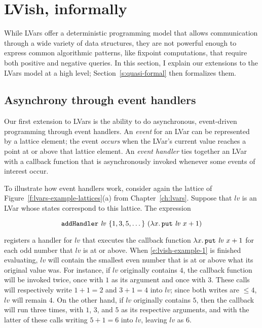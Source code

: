 \section{LVish, informally}\label{s:quasi-informal}

While LVars offer a deterministic programming model that allows
communication through a wide variety of data structures, they are not
powerful enough to express common algorithmic patterns, like fixpoint
computations, that require both positive and negative queries.  In
this section, I explain our extensions to the LVars model at a high
level; Section~\ref{s:quasi-formal} then formalizes them.

\subsection{Asynchrony through event handlers}

Our first extension to LVars is the ability to do asynchronous,
event-driven programming through event handlers.  An \emph{event} for
an LVar can be represented by a lattice element; the event
\emph{occurs} when the LVar's current value reaches a point at or
above that lattice element.  An \emph{event handler} ties together an
LVar with a callback function that is asynchronously invoked whenever
some events of interest occur.

To illustrate how event handlers work, consider again the lattice of
Figure~\ref{f:lvars-example-lattices}(a) from Chapter~\ref{ch:lvars}.
Suppose that $\mathit{lv}$ is an LVar whose states correspond to this
lattice.  The expression

\singlespacing
\begin{equation}
  {\mbox{\texttt{addHandler}}}~\mathit{lv}~\{ 1, 3, 5, \dots \}~(\lambda x.\,\mbox{\texttt{put}}~\mathit{lv}~x+1)
\label{e:lvish-example-1}
\end{equation}
\doublespacing

registers a handler for $\mathit{lv}$ that executes the callback
function $\lambda x.\,\mbox{\texttt{put}}~\mathit{lv}~x+1$ for each odd number that
$\mathit{lv}$ is at or above.  When \ref{e:lvish-example-1} is
finished evaluating, $\mathit{lv}$ will contain the smallest even
number that is at or above what its original value was.  For instance,
if $\mathit{lv}$ originally contains $4$, the callback function will
be invoked twice, once with $1$ as its argument and once with $3$.
These calls will respectively write $1+1 = 2$ and $3+1 = 4$ into
$\mathit{lv}$; since both writes are $\leq 4$, $\mathit{lv}$ will
remain $4$.  On the other hand, if $\mathit{lv}$ originally contains
$5$, then the callback will run three times, with $1$, $3$, and $5$ as
its respective arguments, and with the latter of these calls writing
$5+1 = 6$ into $\mathit{lv}$, leaving $\mathit{lv}$ as $6$.

